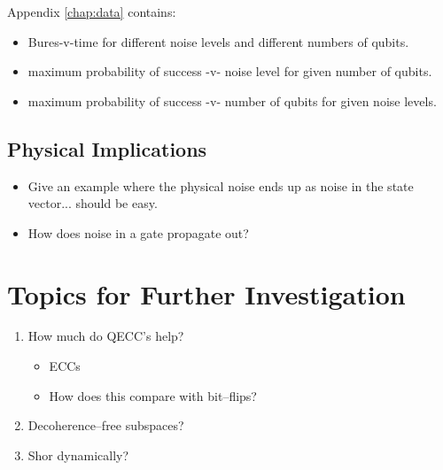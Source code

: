 \pagebreak

\noindent
Appendix \ref{chap:data} contains:
\begin{itemize}
\item Bures-v-time for different noise levels and different numbers of qubits.
\item maximum probability of success -v- noise level for given number of qubits.
\item maximum probability of success -v- number of qubits for given noise levels.
\end{itemize}



\subsection{Physical Implications}

\begin{itemize}
\item Give an example where the physical noise ends up as noise
in the state vector... should be easy.
\item How does noise in a gate propagate out?
\end{itemize}


%

\section{Topics for Further Investigation}

\begin{enumerate}
\item How much do QECC's help?
\begin{itemize}
\item ECCs
\item How does this compare with bit--flips?
\end{itemize}
\item Decoherence--free subspaces?
\item Shor dynamically?
\end{enumerate}
